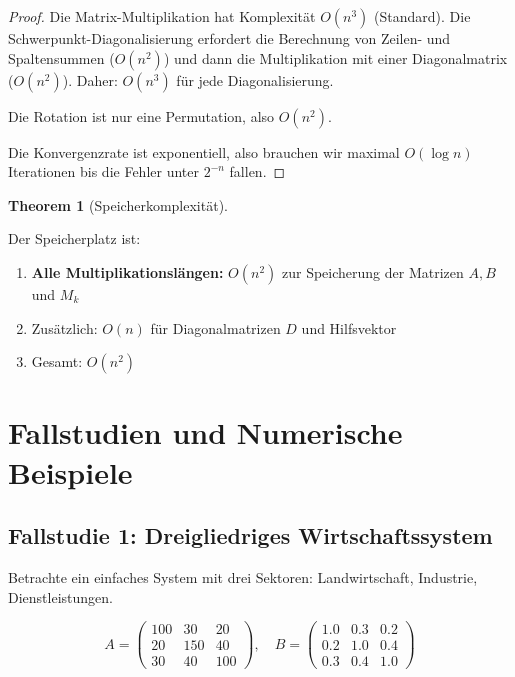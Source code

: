 \documentclass[a4paper,12pt]{article}
\theoremstyle{definition}
\newtheorem{theorem}{Theorem}
\begin{document}
\begin{proof}

Die Matrix-Multiplikation hat Komplexität $O(n^3)$ (Standard). Die Schwerpunkt-Diagonalisierung erfordert die Berechnung von Zeilen- und Spaltensummen ($O(n^2)$) und dann die Multiplikation mit einer Diagonalmatrix ($O(n^2)$). Daher: $O(n^3)$ für jede Diagonalisierung.

Die Rotation ist nur eine Permutation, also $O(n^2)$.

Die Konvergenzrate ist exponentiell, also brauchen wir maximal $O(\log n)$ Iterationen bis die Fehler unter $2^{-n}$ fallen.

\end{proof}

\begin{theorem}[Speicherkomplexität]
\label{thm:memory_complexity}

Der Speicherplatz ist:

\begin{enumerate}
\item \textbf{Alle Multiplikationslängen:} $O(n^2)$ zur Speicherung der Matrizen $A, B$ und $M_k$
\item Zusätzlich: $O(n)$ für Diagonalmatrizen $D$ und Hilfsvektor
\item Gesamt: $O(n^2)$
\end{enumerate}

\end{theorem}

\section{Fallstudien und Numerische Beispiele}

\subsection{Fallstudie 1: Dreigliedriges Wirtschaftssystem}

Betrachte ein einfaches System mit drei Sektoren: Landwirtschaft, Industrie, Dienstleistungen.

\begin{equation}
A = \begin{pmatrix}
100 & 30 & 20 \\
20 & 150 & 40 \\
30 & 40 & 100
\end{pmatrix}, \quad
B = \begin{pmatrix}
1.0 & 0.3 & 0.2 \\
0.2 & 1.0 & 0.4 \\
0.3 & 0.4 & 1.0
\end{pmatrix}
\end{equation}
\end{document}
